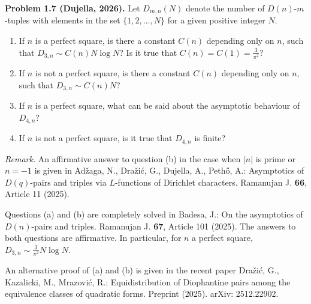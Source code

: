 \textbf{Problem 1.7 (Dujella, 2026).} Let $D_{m,n}(N)$ denote the number of $D(n)$-$m$-tuples with elements in the set $\{1,2,\ldots,N\}$ for a given positive integer $N$.
\begin{enumerate}
\item If $n$ is a perfect square, is there a constant $C(n)$ depending only on $n$, such that $D_{3,n} \sim C(n)N \log N$? Is it true that $C(n) = C(1) = \frac{3}{\pi^2}$?
\item If $n$ is not a perfect square, is there a constant $C(n)$ depending only on $n$, such that $D_{3,n} \sim C(n)N$?
\item If $n$ is a perfect square, what can be said about the asymptotic behaviour of $D_{4,n}$?
\item If $n$ is not a perfect square, is it true that $D_{4,n}$ is finite?
\end{enumerate}

\medskip

\textit{Remark.} An affirmative answer to question (b) in the case when $|n|$ is prime or $n = -1$ is given in Adžaga, N., Dražić, G., Dujella, A., Pethő, A.: Asymptotics of $D(q)$-pairs and triples via $L$-functions of Dirichlet characters. Ramanujan J. \textbf{66}, Article 11 (2025).

Questions (a) and (b) are completely solved in Badesa, J.: On the asymptotics of $D(n)$-pairs and triples. Ramanujan J. \textbf{67}, Article 101 (2025). The answers to both questions are affirmative. In particular, for $n$ a perfect square, $D_{3,n} \sim \frac{3}{\pi^2}N \log N$.

An alternative proof of (a) and (b) is given in the recent paper Dražić, G., Kazalicki, M., Mrazović, R.: Equidistribution of Diophantine pairs among the equivalence classes of quadratic forms. Preprint (2025). arXiv: 2512.22902.
